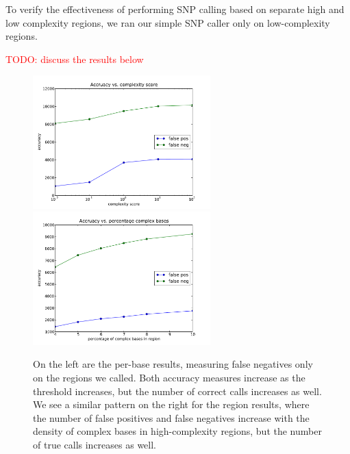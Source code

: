 \documentclass[10pt]{article}
\newcommand\TODO[1]{\textcolor{red}{TODO: #1}}
\begin{document}
To verify the
effectiveness of performing SNP calling based on separate high and low
complexity regions, we ran our simple SNP caller only on low-complexity regions.

\TODO{discuss the results below}

\begin{figure}[h!]
	\includegraphics[width=2.7in]{figs/base_accuracy_vs_thresh.pdf}
	\includegraphics[width=2.7in]{figs/region_accuracy_vs_thresh.pdf}
	\caption{On the left are the per-base results, measuring false negatives only on the regions we called. Both accuracy measures increase as the threshold increases, but the number of correct calls increases as well.  We see a similar pattern on the right for the region results, where the number of false positives and false negatives increase with the density of complex bases in high-complexity regions, but the number of true calls increases as well.}
	\end{figure}
\end{document}
